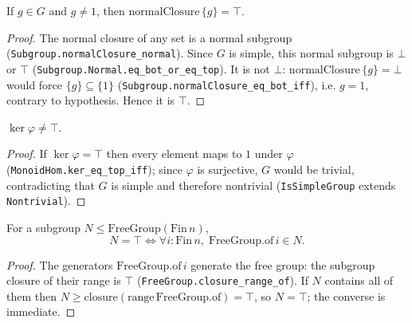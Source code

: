\begin{lemma}
    \label{lem:normalClosure-singleton-top}
    \leanok
    If $g \in G$ and $g \neq 1$, then $\mathrm{normalClosure}\,\{g\} = \top$.
\end{lemma}
\begin{proof}
    The normal closure of any set is a normal subgroup
    (\texttt{Subgroup.normalClosure\_normal}). Since $G$ is simple, this normal
    subgroup is $\bot$ or $\top$ (\texttt{Subgroup.Normal.eq\_bot\_or\_eq\_top}).
    It is not $\bot$: $\mathrm{normalClosure}\,\{g\} = \bot$ would force
    $\{g\} \subseteq \{1\}$ (\texttt{Subgroup.normalClosure\_eq\_bot\_iff}), i.e.
    $g = 1$, contrary to hypothesis. Hence it is $\top$.
\end{proof}

\begin{lemma}
    \label{lem:ker-ne-top}
    \leanok
    $\ker\varphi \neq \top$.
\end{lemma}
\begin{proof}
    If $\ker\varphi = \top$ then every element maps to $1$ under $\varphi$
    (\texttt{MonoidHom.ker\_eq\_top\_iff}); since $\varphi$ is surjective, $G$
    would be trivial, contradicting that $G$ is simple and therefore nontrivial
    (\texttt{IsSimpleGroup} extends \texttt{Nontrivial}).
\end{proof}

\begin{lemma}
    \label{lem:top-iff-generators}
    \leanok
    For a subgroup $N \le \mathrm{FreeGroup}(\mathrm{Fin}\,n)$,
    \[
        N = \top \iff \forall i : \mathrm{Fin}\,n,\; \mathrm{FreeGroup.of}\,i \in N .
    \]
\end{lemma}
\begin{proof}
    The generators $\mathrm{FreeGroup.of}\,i$ generate the free group: the
    subgroup closure of their range is $\top$
    (\texttt{FreeGroup.closure\_range\_of}). If $N$ contains all of them then
    $N \ge \mathrm{closure}(\mathrm{range}\,\mathrm{FreeGroup.of}) = \top$, so
    $N = \top$; the converse is immediate.
\end{proof}

